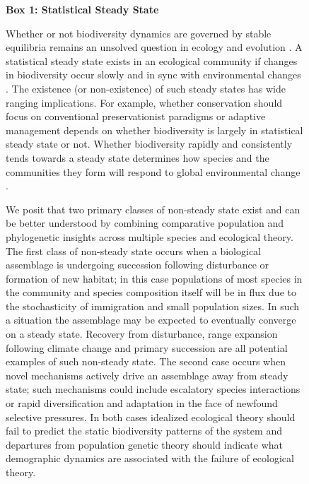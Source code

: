 \documentclass[11pt]{article}
\begin{document}
\begin{figure}
\vspace{-20pt}
\colorbox{gray!20}{
  \begin{minipage}{0.6\textwidth}
    \noindent    
    {\bf Box 1: Statistical Steady State}

    Whether or not biodiversity dynamics are governed by stable
    equilibria remains an unsolved question in ecology and evolution
    \citep{rabosky2015amNat, harmon2015amNat}. A
    statistical steady state exists in an ecological community if
    changes in biodiversity occur slowly and in sync with
    environmental changes \citep{harte2011}. The existence (or
    non-existence) of such steady states has wide ranging
    implications. For example, whether conservation should focus on
    conventional preservationist paradigms or adaptive management
    \citep{levin1999} depends on whether biodiversity is largely in
    statistical steady state or not. Whether biodiversity rapidly and
    consistently tends towards a steady state determines how species
    and the communities they form will respond to global environmental
    change \citep{barnosky2012}.

    We posit that two primary classes of non-steady state exist and
    can be better understood by combining comparative population and
    phylogenetic insights across multiple species and ecological
    theory. The first class of non-steady state occurs when a
    biological assemblage is undergoing succession following
    disturbance or formation of new habitat; in this case populations
    of most species in the community and species composition itself
    will be in flux due to the stochasticity of immigration and small
    population sizes. In such a situation the assemblage may be
    expected to eventually converge on a steady state. Recovery from
    disturbance, range expansion following climate change and primary
    succession are all potential examples of such non-steady
    state. The second case occurs when novel mechanisms actively drive
    an assemblage away from steady state; such mechanisms could
    include escalatory species interactions or rapid diversification
    and adaptation in the face of newfound selective pressures. In
    both cases idealized ecological theory should fail to predict the
    static biodiversity patterns of the system and departures from
    population genetic theory should indicate what demographic
    dynamics are associated with the failure of ecological theory.
  \end{minipage}
}
\vspace{-20pt}
\end{figure}
\end{document}

